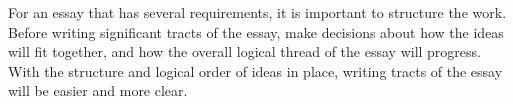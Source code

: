 \documentclass{article}
\begin{document}
For an essay that has several requirements, it is important to structure the work.  Before writing significant tracts of the essay, make decisions about how the ideas will fit together, and how the overall logical thread of the essay will progress.  With the structure and logical order of ideas in place, writing tracts of the essay will be easier and more clear.
\end{document}
